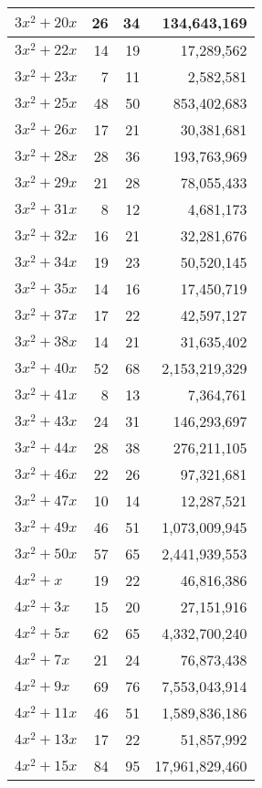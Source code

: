 \documentclass[a4paper]{amsproc}
\theoremstyle{plain}
\theoremstyle{named}
\begin{document}
\begin{longtable}{ | l | r | r | r | }
$3x^2 + 20x$ & 26 & 34 & 134{,}643{,}169 \\ \hline
$3x^2 + 22x$ & 14 & 19 & 17{,}289{,}562 \\ \hline
$3x^2 + 23x$ & 7 & 11 & 2{,}582{,}581 \\ \hline
$3x^2 + 25x$ & 48 & 50 & 853{,}402{,}683 \\ \hline
$3x^2 + 26x$ & 17 & 21 & 30{,}381{,}681 \\ \hline
$3x^2 + 28x$ & 28 & 36 & 193{,}763{,}969 \\ \hline
$3x^2 + 29x$ & 21 & 28 & 78{,}055{,}433 \\ \hline
$3x^2 + 31x$ & 8 & 12 & 4{,}681{,}173 \\ \hline
$3x^2 + 32x$ & 16 & 21 & 32{,}281{,}676 \\ \hline
$3x^2 + 34x$ & 19 & 23 & 50{,}520{,}145 \\ \hline
$3x^2 + 35x$ & 14 & 16 & 17{,}450{,}719 \\ \hline
$3x^2 + 37x$ & 17 & 22 & 42{,}597{,}127 \\ \hline
$3x^2 + 38x$ & 14 & 21 & 31{,}635{,}402 \\ \hline
$3x^2 + 40x$ & 52 & 68 & 2{,}153{,}219{,}329 \\ \hline
$3x^2 + 41x$ & 8 & 13 & 7{,}364{,}761 \\ \hline
$3x^2 + 43x$ & 24 & 31 & 146{,}293{,}697 \\ \hline
$3x^2 + 44x$ & 28 & 38 & 276{,}211{,}105 \\ \hline
$3x^2 + 46x$ & 22 & 26 & 97{,}321{,}681 \\ \hline
$3x^2 + 47x$ & 10 & 14 & 12{,}287{,}521 \\ \hline
$3x^2 + 49x$ & 46 & 51 & 1{,}073{,}009{,}945 \\ \hline
$3x^2 + 50x$ & 57 & 65 & 2{,}441{,}939{,}553 \\ \hline
$4x^2 + x$ & 19 & 22 & 46{,}816{,}386 \\ \hline
$4x^2 + 3x$ & 15 & 20 & 27{,}151{,}916 \\ \hline
$4x^2 + 5x$ & 62 & 65 & 4{,}332{,}700{,}240 \\ \hline
$4x^2 + 7x$ & 21 & 24 & 76{,}873{,}438 \\ \hline
$4x^2 + 9x$ & 69 & 76 & 7{,}553{,}043{,}914 \\ \hline
$4x^2 + 11x$ & 46 & 51 & 1{,}589{,}836{,}186 \\ \hline
$4x^2 + 13x$ & 17 & 22 & 51{,}857{,}992 \\ \hline
$4x^2 + 15x$ & 84 & 95 & 17{,}961{,}829{,}460 \\ \hline

\end{longtable}
\end{document}
